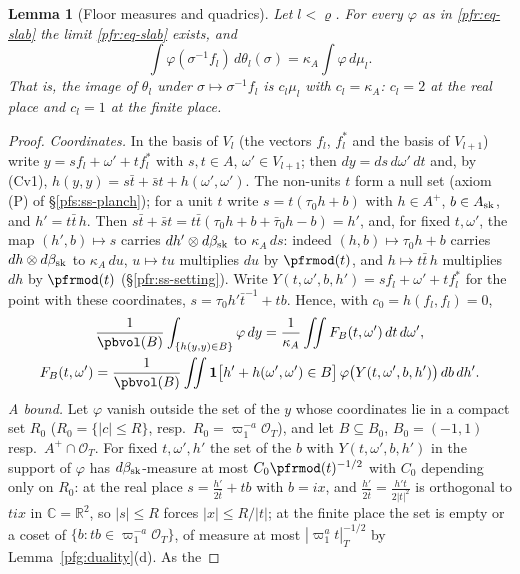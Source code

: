 \documentclass[10pt]{amsart}
\newtheorem{lemma}[theorem]{Lemma}
\theoremstyle{definition}
\theoremstyle{remark}
\newcommand{\C}{\mathbb C}
\newcommand{\R}{\mathbb R}
\providecommand{\auO}{\mathcal O}
\begin{document}
\begin{lemma}[Floor measures and quadrics]\label{pfr:floorquad}
Let $l<\varrho$. For every $\varphi$ as in \eqref{pfr:eq-slab} the limit \eqref{pfr:eq-slab} exists, and
\[
\int\varphi(\sigma^{-1}f_l)\,d\theta_l(\sigma)=\kappa_A\int\varphi\,d\mu_l .
\]
That is, the image of $\theta_l$ under $\sigma\mapsto\sigma^{-1}f_l$ is $c_l\mu_l$ with $c_l=\kappa_A$: $c_l=2$ at the
real place and $c_l=1$ at the finite place.
\end{lemma}
\begin{proof}
\emph{Coordinates.} In the basis of $V_l$ (the vectors $f_l$, $f_l^*$ and the basis of $V_{l+1}$) write
$y=sf_l+\omega'+tf_l^*$ with $s,t\in A$,
$\omega'\in V_{l+1}$; then $dy=ds\,d\omega'\,dt$ and, by (Cv1), $h(y,y)=s\bar t+\bar st+h(\omega',\omega')$. The non-units
$t$ form a null set (axiom (P) of \S\ref{pfs:ss-planch}); for a unit $t$ write $s=t(\tau_0h+b)$ with $h\in A^+$,
$b\in A_{\rm sk}$, and $h'=t\bar t\,h$. Then $s\bar t+\bar st=t\bar t(\tau_0h+b+\bar\tau_0h-b)=h'$, and, for fixed
$t,\omega'$, the map $(h',b)\mapsto s$ carries $dh'\otimes d\beta_{\rm sk}$ to $\kappa_A\,ds$: indeed $(h,b)\mapsto\tau_0h+b$
carries $dh\otimes d\beta_{\rm sk}$ to $\kappa_A\,du$, $u\mapsto tu$ multiplies $du$ by $\pfrmod(t)$, and $h\mapsto t\bar t\,h$
multiplies $dh$ by $\pfrmod(t)$ (\S\ref{pfr:ss-setting}). Write $Y(t,\omega',b,h')=sf_l+\omega'+tf_l^*$ for the
point with these coordinates, $s=\tau_0h'\bar t^{-1}+tb$. Hence, with $c_0=h(f_l,f_l)=0$,
\[
\begin{gathered}\frac1{\pbvol(B)}\int_{\{h(y,y)\in B\}}\varphi\,dy=\frac1{\kappa_A}\iint F_B(t,\omega')\,dt\,d\omega',\\
F_B(t,\omega')=\frac1{\pbvol(B)}\iint\mathbf 1\bigl[h'+h(\omega',\omega')\in B\bigr]\,\varphi\bigl(Y(t,\omega',b,h')\bigr)\,
db\,dh'.\end{gathered}
\]
\emph{A bound.} Let $\varphi$ vanish outside the set of the $y$ whose coordinates lie in a compact set $R_0$
($R_0=\{|c|\le R\}$, resp.\ $R_0=\varpi_1^{-a}\auO_T$), and let $B\subseteq B_0$, $B_0=(-1,1)$ resp.\ $A^+\cap\auO_T$.
For fixed $t,\omega',h'$ the set of the $b$ with $Y(t,\omega',b,h')$ in the support of $\varphi$ has
$d\beta_{\rm sk}$-measure at most $C_0\pfrmod(t)^{-1/2}$ with $C_0$ depending only on $R_0$: at the real place $s=
\frac{h'}{2\bar t}+tb$ with $b=ix$, and $\frac{h'}{2\bar t}=\frac{h't}{2|t|^2}$ is orthogonal to $tix$ in $\C=\R^2$, so
$|s|\le R$ forces $|x|\le R/|t|$; at the finite place the set is empty or a coset of
$\{b:tb\in\varpi_1^{-a}\auO_T\}$, of measure at most $|\varpi_1^at|_T^{-1/2}$ by Lemma~\ref{pfg:duality}(d). As the

\end{proof}
\end{document}
